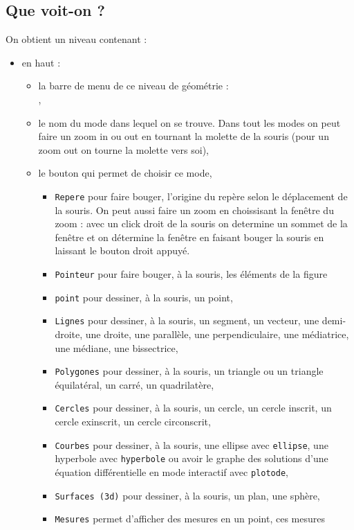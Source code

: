 \documentclass[a4paper,11pt]{article}
\begin{document}
\subsection{Que voit-on ?}\label{sec:voir2d}
On obtient un niveau contenant :
\begin{itemize}
\item en haut :
\begin{itemize}
\item la barre de menu de ce niveau de g\'eom\'etrie :\\
,
\item le nom du mode dans lequel on se trouve. Dans tout les modes on peut 
faire un zoom in ou out en tournant la molette de la souris (pour un zoom out 
on tourne la molette vers soi),
\item le bouton  qui permet de choisir ce mode, 
\begin{itemize}
\item {\tt Repere} pour faire bouger, l'origine du rep\`ere selon le 
d\'eplacement de la souris. On peut aussi faire un zoom en choissisant la 
fen\^etre du zoom : avec un click droit de la souris on determine un sommet de
la fen\^etre et on d\'etermine la fen\^etre en faisant bouger la souris en
laissant le bouton droit appuy\'e.  
\item {\tt Pointeur} pour faire bouger, \`a la souris, les \'el\'ements de la 
figure
\item {\tt point} pour dessiner, \`a la souris, un point,
\item {\tt Lignes} pour dessiner, \`a la souris, un segment, un vecteur, 
une demi-droite, une droite, une parall\`ele, une perpendiculaire, 
une m\'ediatrice, une m\'ediane, une bissectrice, 
\item {\tt Polygones} pour dessiner, \`a la souris, un triangle ou 
un triangle \'equilat\'eral, un carr\'e, un quadrilat\`ere,
\item {\tt Cercles} pour dessiner, \`a la souris, un cercle, un cercle inscrit,
un cercle exinscrit, un cercle circonscrit,  
\item {\tt Courbes} pour dessiner, \`a la souris, une ellipse avec 
{\tt ellipse}, une hyperbole  avec {\tt hyperbole} ou
avoir le graphe des solutions d'une \'equation diff\'erentielle en mode 
interactif avec {\tt plotode},
\item {\tt Surfaces (3d)} pour dessiner, \`a la souris, un plan, une sph\`ere,
\item {\tt Mesures} permet d'afficher des mesures en un point, ces mesures 

\end{itemize}
\end{itemize}
\end{itemize}
\end{document}
